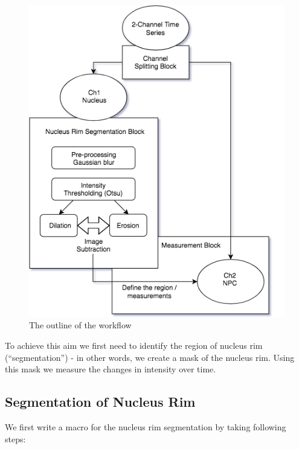 \begin{figure}[!ht]
\begin{center}
\includegraphics[scale=0.6]{fig/nucrimMeasurementsDiagram.png}
\caption{The outline of the workflow}
\label{fig:outline}
\end{center}
\end{figure}

To achieve this aim we first need to identify the region of nucleus rim (``segmentation'') - in other words, we create a mask of the nucleus rim. Using this mask we measure the changes in intensity over time. 

\subsection{Segmentation of Nucleus Rim}

We first write a macro for the nucleus rim segmentation by taking following steps:  

